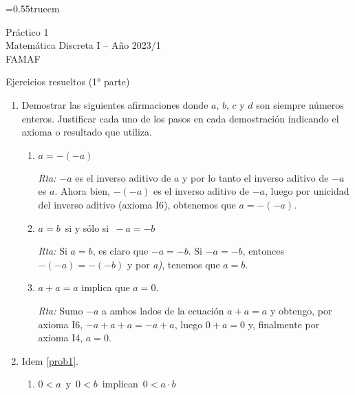 \documentclass[a4paper,12pt,twoside,spanish,reqno]{amsbook}
\numberwithin{equation}{section}
\newcommand{\rta}{\noindent\textit{Rta: }}
\begin{document}
    \baselineskip=0.55truecm %
    

    
    
    {\bf \begin{center} Práctico 1 \\ Matemática Discreta I -- Año 2023/1 \\ FAMAF \end{center}}
    
    {\bf \begin{center} Ejercicios resueltos (1° parte)\end{center}}
    
    
    
    \begin{enumerate}
    \setlength\itemsep{1.1em}
        
        \item\label{prob1} Demostrar las siguientes afirmaciones donde $a$, $b$, $c$ y $d$ son siempre números enteros. Justificar cada uno de los pasos en cada demostración indicando el axioma o resultado que utiliza.
        \begin{enumerate}
            \item  $a=-(-a)$
            
            \rta $-a$  es el inverso aditivo de $a$ y por lo tanto el inverso aditivo de $-a$ es $a$.  Ahora bien, $-(-a)$  es el inverso aditivo de  $-a$, luego por  unicidad del inverso aditivo (axioma { I6}), obtenemos que $a = -(-a)$.
            
            \item  $a=b\,$ si y sólo si $\,-a=-b$
            
            \rta Si  $a=b$, es claro que $-a=-b$. Si $-a= -b$, entonces $-(-a) = -(-b)$ y  por \textit{a)}, tenemos que $a=b$.  
            
            \item  $a+a=a$ implica que  $a=0$.
            
            \rta Sumo $-a$ a ambos lados de la ecuación  $a+a=a$ y obtengo, por axioma I6,  $-a + a + a = -a +a$, luego $0 +a = 0$ y, finalmente por axioma I4, $a=0$. 
            
        \end{enumerate}
        
    
        
        \item Idem \ref{prob1}.
        
        \begin{enumerate}
            \item $0<a\,$ y $\,0<b\,$ implican $\,0<a\cdot b$
            

\end{enumerate}
\end{enumerate}
\end{document}
